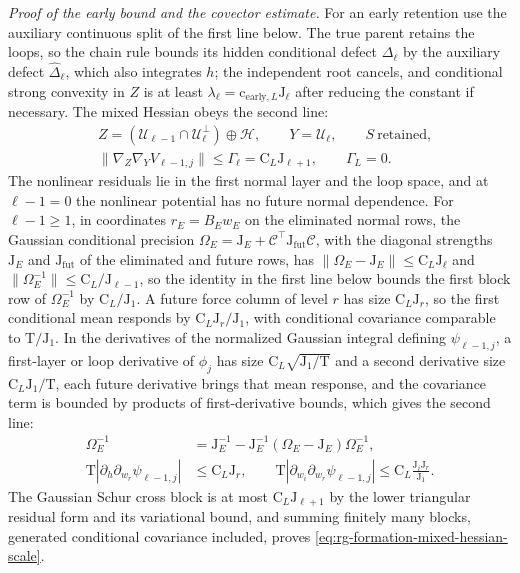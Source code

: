 \noindent\emph{Proof of the early bound and the covector estimate.}
For an early retention use the auxiliary continuous split of the first line
below. The true parent retains the loops, so the chain rule bounds its hidden
conditional defect \(\Delta_\ell\) by the auxiliary defect
\(\widehat\Delta_\ell\), which also integrates \(h\); the independent root
cancels, and conditional strong convexity in \(Z\) is at least
\(\lambda_\ell=\mathrm c_{\mathrm{early},L}\mathrm J_\ell\) after reducing the
constant if necessary. The mixed Hessian obeys the second line:
\begin{align}
 &Z=(\mathcal U_{\ell-1}\cap\mathcal U_\ell^\perp)\oplus\mathcal H,
 \qquad Y=\mathcal U_\ell,
 \qquad S\ \text{retained},
 \label{eq:rg-formation-auxiliary-split}\\
 &\|\nabla_Z\nabla_YV_{\ell-1,j}\|\le\Gamma_\ell=\mathrm C_L\mathrm J_{\ell+1},
 \qquad \Gamma_L=0.
 \label{eq:rg-formation-mixed-hessian-scale}
\end{align}
The nonlinear residuals lie in the first normal layer and the loop space, and
at \(\ell-1=0\) the nonlinear potential has no future normal dependence. For
\(\ell-1\ge1\), in coordinates \(r_E=B_Ew_E\) on the eliminated normal rows,
the Gaussian conditional precision
\(\Omega_E=\mathrm J_E+\mathcal C^\top\mathrm J_{\mathrm{fut}}\mathcal C\), with
the diagonal strengths \(\mathrm J_E\) and \(\mathrm J_{\mathrm{fut}}\) of the
eliminated and future rows, has \(\|\Omega_E-\mathrm J_E\|\le\mathrm C_L\mathrm J_\ell\)
and \(\|\Omega_E^{-1}\|\le\mathrm C_L/\mathrm J_{\ell-1}\), so the identity in the
first line below bounds the first block row of \(\Omega_E^{-1}\) by
\(\mathrm C_L/\mathrm J_1\). A future force column of level \(r\) has size
\(\mathrm C_L\mathrm J_r\), so the first conditional mean responds by
\(\mathrm C_L\mathrm J_r/\mathrm J_1\), with conditional covariance comparable to
\(\mathrm T/\mathrm J_1\). In the derivatives of the normalized Gaussian
integral defining \(\psi_{\ell-1,j}\), a first-layer or loop derivative of
\(\phi_j\) has size \(\mathrm C_L\sqrt{\mathrm J_1/\mathrm T}\) and a second
derivative size \(\mathrm C_L\mathrm J_1/\mathrm T\), each future derivative
brings that mean response, and the covariance term is bounded by products of
first-derivative bounds, which gives the second line:
\begin{align}
 \Omega_E^{-1}&=\mathrm J_E^{-1}
           -\mathrm J_E^{-1}(\Omega_E-\mathrm J_E)\Omega_E^{-1},
 \label{eq:rg-formation-first-row-resolvent}\\
 \mathrm T|\partial_h\partial_{w_r}\psi_{\ell-1,j}|&\le \mathrm C_L\mathrm J_r,\qquad
 \mathrm T|\partial_{w_i}\partial_{w_r}\psi_{\ell-1,j}|
       \le \mathrm C_L\frac{\mathrm J_i\mathrm J_r}{\mathrm J_1}.
 \label{eq:rg-formation-future-derivative-scales}
\end{align}
The Gaussian Schur cross block is at most \(\mathrm C_L\mathrm J_{\ell+1}\) by
the lower triangular residual form and its variational bound, and summing
finitely many blocks, generated conditional covariance included, proves
\cref{eq:rg-formation-mixed-hessian-scale}.

